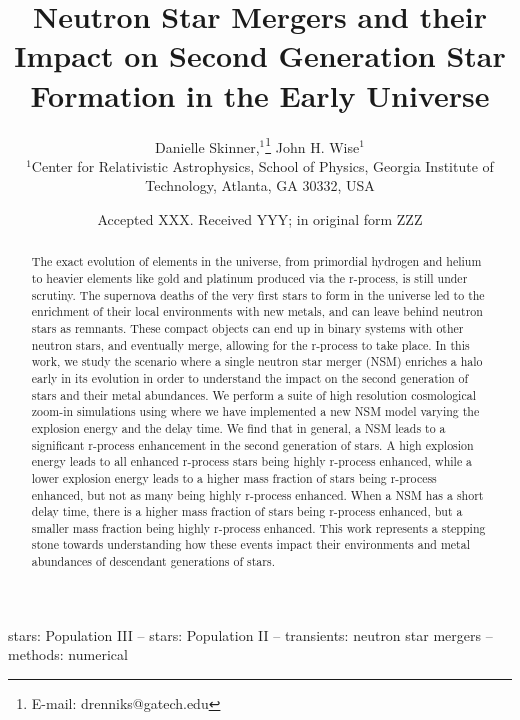 \documentclass[fleqn,usenatbib]{mnras}
\title[NSMs from Pop III stars]{Neutron Star Mergers and their Impact on Second Generation Star Formation in the Early Universe}
\author[Skinner \& Wise]{
Danielle Skinner,$^{1}$\thanks{E-mail: drenniks@gatech.edu}
John H. Wise$^{1}$
\\
$^{1}$Center for Relativistic Astrophysics, School of Physics, Georgia Institute of Technology, Atlanta, GA 30332, USA\\
}
\date{Accepted XXX. Received YYY; in original form ZZZ}
\begin{document}
\label{firstpage}
\pagerange{\pageref{firstpage}--\pageref{lastpage}}
\maketitle

\begin{abstract}
The exact evolution of elements in the universe, from primordial hydrogen and helium to heavier elements like gold and platinum produced via the r-process, is still under scrutiny. The supernova deaths of the very first stars to form in the universe led to the enrichment of their local environments with new metals, and can leave behind neutron stars as remnants. These compact objects can end up in binary systems with other neutron stars, and eventually merge, allowing for the r-process to take place. In this work, we study the scenario where a single neutron star merger (NSM) enriches a halo early in its evolution in order to understand the impact on the second generation of stars and their metal abundances. We perform a suite of high resolution cosmological zoom-in simulations using \enzo{} where we have implemented a new NSM model varying the explosion energy and the delay time. We find that in general, a NSM leads to a significant r-process enhancement in the second generation of stars. A high explosion energy leads to all enhanced r-process stars being highly r-process enhanced, while a lower explosion energy leads to a higher mass fraction of stars being r-process enhanced, but not as many being highly r-process enhanced. When a NSM has a short delay time, there is a higher mass fraction of stars being r-process enhanced, but a smaller mass fraction being highly r-process enhanced. This work represents a stepping stone towards understanding how these events impact their environments and metal abundances of descendant generations of stars.
\end{abstract}

\begin{keywords}
stars: Population III -- stars: Population II -- transients: neutron star mergers -- methods: numerical
\end{keywords}



\end{document}
